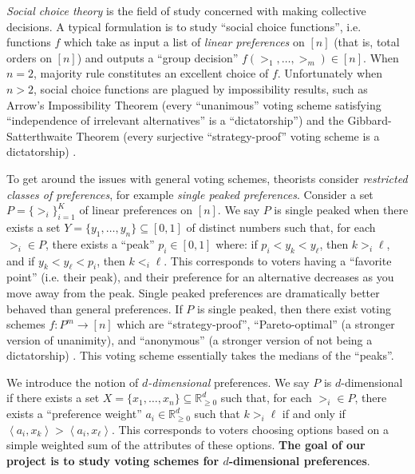 \documentclass[12pt]{article}
\newcommand{\R}{\mathbb{R}}
\newcommand{\ip}[2]{\left\langle{#1},{#2}\right\rangle}
\newcommand{\1}[1]{\mathds{1}[{#1}]}
\begin{document}
  \emph{Social choice theory} is the field of study
  concerned with making collective decisions. A typical formulation
  is to study ``social choice functions'', i.e.
  functions $f$ which take as input a list of \emph{linear
  preferences} on $[n]$ (that is, total orders on $[n]$) and outputs a
  ``group decision'' $f(>_1,\ldots,>_m) \in [n]$.
  When $n = 2$, majority rule constitutes an excellent choice of $f$.
  Unfortunately when $n>2$, social choice functions are
  plagued by impossibility results,
  such as Arrow's Impossibility Theorem (every ``unanimous'' voting scheme
  satisfying ``independence of irrelevant alternatives'' is a ``dictatorship'')
  and the Gibbard-Satterthwaite Theorem (every surjective 
  ``strategy-proof'' voting scheme is a dictatorship) 
  \cite{AgtBookMechDesignInto}.

  To get around the issues with general voting schemes, theorists
  consider \emph{restricted classes of preferences},
  for example \emph{single peaked preferences}.
  Consider a set $P = \{>_i\}_{i=1}^K$ of linear preferences on $[n]$.
  We say $P$ is single peaked when there exists a set
  $Y = \{y_1,\ldots,y_n\} \subseteq [0,1]$ of distinct numbers such that,
  for each $>_i \in P$, there exists a ``peak'' $p_i \in [0,1]$
  where: if $p_i < y_k < y_\ell$, then $k >_i \ell$,
  and if $y_k < y_\ell < p_i$, then $k <_i \ell$.
  This corresponds to voters having a ``favorite point'' (i.e.
  their peak), and their preference for an alternative decreases
  as you move away from the peak.
  Single peaked preferences are dramatically better behaved
  than general preferences.
  If $P$ is single peaked, then there exist voting schemes
  $f : P^m \to [n]$ which are ``strategy-proof'',
  ``Pareto-optimal'' (a stronger
  version of unanimity), and ``anonymous'' (a stronger version
  of not being a dictatorship) \cite{AgtBookNoMoney}.
  This voting scheme essentially takes the medians of the ``peaks''.

  We introduce the notion of \emph{$d$-dimensional} preferences.
  We say $P$ is $d$-dimensional if there exists a set
  $X = \{x_1,\ldots,x_n\} \subseteq \R_{\ge 0}^d$ such that, for each $>_i \in P$,
  there exists a ``preference weight'' $a_i\in \R_{\ge 0}^d$ such that
  $k >_i \ell$ if and only if $\ip{a_i}{x_k} > \ip{a_i}{x_\ell}$.
  This corresponds to voters choosing options based on a simple weighted
  sum of the attributes of these options.
  \textbf{The goal of our project is to study voting schemes
  for $d$-dimensional preferences}.
\end{document}

